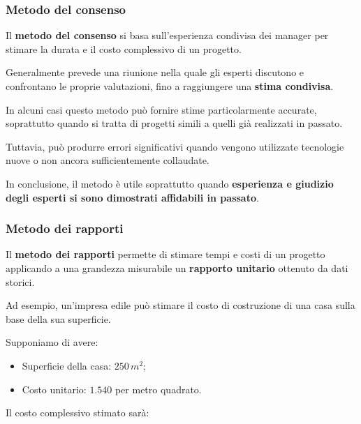 \subsubsection*{Metodo del consenso}

\noindent Il \textbf{metodo del consenso} si basa
sull'esperienza condivisa dei manager per stimare
la durata e il costo complessivo di un progetto.

\medskip

\noindent Generalmente prevede una riunione nella quale
gli esperti discutono e confrontano le proprie valutazioni,
fino a raggiungere una \textbf{stima condivisa}.

\medskip

\noindent In alcuni casi questo metodo può fornire
stime particolarmente accurate, soprattutto
quando si tratta di progetti simili a quelli
già realizzati in passato.

\medskip

\noindent Tuttavia, può produrre errori significativi
quando vengono utilizzate tecnologie nuove
o non ancora sufficientemente collaudate.

\medskip

\noindent In conclusione, il metodo è utile soprattutto
quando \textbf{esperienza e giudizio degli esperti
si sono dimostrati affidabili in passato}.


\subsubsection*{Metodo dei rapporti}

\noindent Il \textbf{metodo dei rapporti} permette
di stimare tempi e costi di un progetto applicando
a una grandezza misurabile un \textbf{rapporto unitario}
ottenuto da dati storici.

\medskip

\noindent Ad esempio, un'impresa edile può stimare
il costo di costruzione di una casa sulla base
della sua superficie.

\medskip

\noindent Supponiamo di avere:

\begin{itemize}
    \item Superficie della casa: $250\,m^2$;
    \item Costo unitario: $1.540$ per metro quadrato.
\end{itemize}

\noindent Il costo complessivo stimato sarà:

